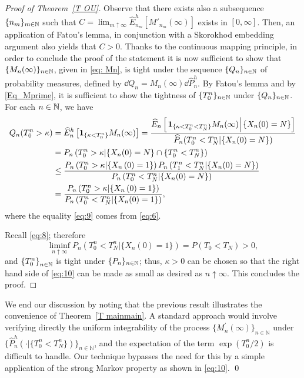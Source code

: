 \begin{proof}[Proof of Theorem~\ref{T OU}]
Observe that there exists also a subsequence $\{n_m\}_{m \in \mathbb{N}}$ such that $C = \lim_{m \uparrow \infty} \widehat E^h_{n_m}[M'_{n_m} (\infty)]$ exists in $[0, \infty]$. Then, an application of Fatou's lemma, in conjunction with a Skorokhod embedding argument also yields that $C>0$.  Thanks to the continuous mapping principle, in order to conclude the proof of the statement it is now sufficient to show that  $\{M_{n}(\infty)\}_{n \in \mathbb{N}}$, given in \eqref{eq: Mn}, is tight under the sequence $\{Q_n\}_{n \in \mathbb{N}}$  of probability measures, defined by  $\dd Q_n  = M_n(\infty) \dd \widehat P^h_n$. By Fatou's lemma and by  \eqref{Eq_Mprime}, it is sufficient to show the tightness of $\{T_0^{n}\}_{n \in \mathbb{N}}$ under $\{Q_{n}\}_{n\in \mathbb{N}}$.
For each $n\in \mathbb{N}$, we have
\begin{align}
	Q_n(T_0^n > \kappa) &= \widehat E^h_n\left[\1_{\{\kappa < T_0^n\}} M_n(\infty)\right]
		= \frac{\widehat E_n\left[\left. \1_{\{\kappa < T^n_0 < T_N^n\}} M_n(\infty) \right|\{X_n(0) = N\}\right]}{\widehat{P}_n(T^n_0 < T_N^n| \{X_n(0) = N\})} \nonumber\\
		&= P_n\left( T_{0}^{n}>\kappa |  \{X_{n}(0)=N\} \cap \{T_{0}^{n}<T_{N}^{n}\} \right)     \label{eq:9}\\
%
&\leq \frac{P_n\left( T_{0}^{n}>\kappa |\{X_{n}\left( 0\right) =1 \}\right)
P_n\left( T_{1 }^{n}<T_{N}^{n}  | \{X_{n}(0)=N\}\right) }{%
P_n\left( T_{0}^{n}<T_{N}^{n} |\{
X_{n}(0)=N\}\right) }   \nonumber\\
%
&= \frac{P_n\left( T_{0}^{n}>\kappa | \{X_{n}\left( 0\right) =1 \} \right)
}{P_n\left( T_{0}^{n}<T_{N}^{n}  |  \{X_{n}(0)=1 \}\right) },  \label{eq:10}
\end{align}
where the equality \eqref{eq:9} comes from \eqref{eq:6}.

Recall \eqref{eq:8}; therefore%
\begin{equation*}
\liminf_{n \uparrow \infty }P_n\left( T_{0}^{n}<T_{N}^{n}  |  \{X_{n}(0)=1 \} \right) =P\left( T_{0}<T_{N} \right) >0,
\end{equation*}%
and $\left\{ T_{0}^{n}\right\} _{n\in \mathbb{N}}$ is tight under $\{P_{n}\}_{n \in \mathbb{N}}$; thus, $\kappa
>0$ can be chosen so that the right hand side of \eqref{eq:10} can be made
as small as desired as $n\uparrow \infty $.
This concludes the proof.
\end{proof}

\begin{remark}
We end our discussion by noting that the previous result illustrates the
convenience of Theorem~\ref{T mainmain}. A standard approach would involve
verifying directly the uniform integrability of the process $\{M_{n}^{\prime
}(\infty )\}_{n\in \mathbb{N}}$ under $\{\widehat P_{n}^h(\cdot
| \{T_{0}^{n}<T_{N}^{n}\})\}_{n\in \mathbb{N}}$, and the
expectation of the term $\exp \left( T_{0}^{n}/2\right) $ is difficult to
handle. Our technique bypasses the need for this by a simple application of
the strong Markov property as shown in \eqref{eq:10}. \qed
\end{remark}

\setlength{\bibsep}{1pt}


{} {} %
%
{}


